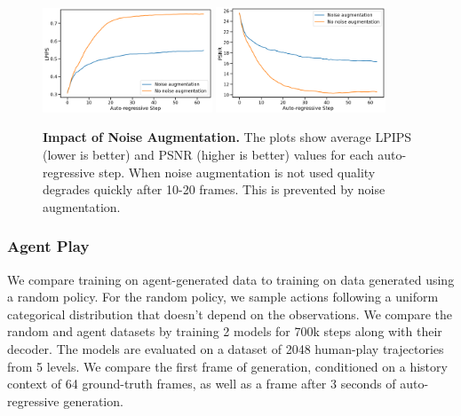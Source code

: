 \documentclass{article} %
\begin{document}
\begin{figure}[h]
    \centering
    \includegraphics[width=0.45\textwidth]{figures/noise_aug_ablation_lpips_step_200k_08212024.png}
    \includegraphics[width=0.45\textwidth]{figures/noise_aug_ablation_psnr_step_200k_08212024.png}
    \caption{\textbf{Impact of Noise Augmentation.} The plots show average LPIPS (lower is better) and PSNR (higher is better) values for each auto-regressive step. When noise augmentation is not used quality degrades quickly after 10-20 frames. This is prevented by noise augmentation.}
    \label{fig:noise_aug_abalation}
\end{figure}

\subsubsection{Agent Play}
\label{agent-play-ablation}

We compare training on agent-generated data to training on data generated using a random policy. For the random policy, we sample actions following a uniform categorical distribution that doesn't depend on the observations. We compare the random and agent datasets by training 2 models for 700k steps along with their decoder. The models are evaluated on a dataset of 2048 human-play trajectories from 5 levels. We compare the first frame of generation, conditioned on a history context of 64 ground-truth frames, as well as a frame after 3 seconds of auto-regressive generation.
\end{document}
